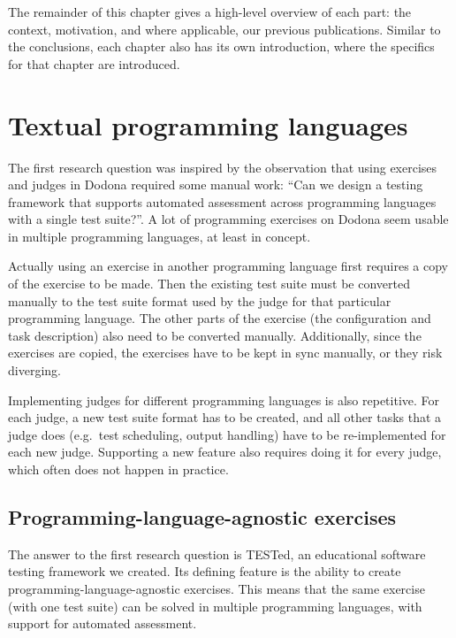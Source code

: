 \documentclass[../main]{subfiles}
\begin{document}
The remainder of this chapter gives a high-level overview of each part: the context, motivation, and where applicable, our previous publications.
Similar to the conclusions, each chapter also has its own introduction, where the specifics for that chapter are introduced.

\section{Textual programming languages}\label{sec:intro-tested}

The first research question  was inspired by the observation that using exercises and judges in Dodona required some manual work: ``Can we design a testing framework that supports automated assessment across programming languages with a single test suite?''.
A lot of programming exercises on Dodona seem usable in multiple programming languages, at least in concept.

Actually using an exercise in another programming language first requires a copy of the exercise to be made.
Then the existing test suite must be converted manually to the test suite format used by the judge for that particular programming language.
The other parts of the exercise (the configuration and task description) also need to be converted manually.
Additionally, since the exercises are copied, the exercises have to be kept in sync manually, or they risk diverging.

Implementing judges for different programming languages is also repetitive.
For each judge, a new test suite format has to be created, and all other tasks that a judge does (e.g.\ test scheduling, output handling) have to be re-implemented for each new judge.
Supporting a new feature also requires doing it for every judge, which often does not happen in practice.

\subsection{Programming-language-agnostic exercises}\label{subsec:programming-language-agnostic-testing}

The answer to the first research question  is TESTed, an educational software testing framework we created.
Its defining feature is the ability to create programming-language-agnostic exercises.
This means that the same exercise (with one test suite) can be solved in multiple programming languages, with support for automated assessment.
\end{document}
